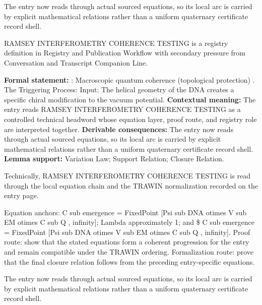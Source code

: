 The entry now reads through actual sourced equations, so its local arc is carried by explicit mathematical relations rather than a uniform quaternary certificate record shell.
\clearpage


\begingroup\small
{}
RAMSEY INTERFEROMETRY COHERENCE TESTING is a registry definition in Registry and Publication Workflow with secondary pressure from Conversation and Transcript Companion Line.

\begingroup\footnotesize\setlength{\emergencystretch}{3em}\sloppy
\textbf{Formal statement:} : Macroscopic quantum coherence (topological protection) . The Triggering Process: Input: The helical geometry of the DNA creates a specific chiral modification to the vacuum potential. \textbf{Contextual meaning:} The entry reads RAMSEY INTERFEROMETRY COHERENCE TESTING as a controlled technical headword whose equation layer, proof route, and registry role are interpreted together. \textbf{Derivable consequences:} The entry now reads through actual sourced equations, so its local arc is carried by explicit mathematical relations rather than a uniform quaternary certificate record shell. \textbf{Lemma support:} Variation Law; Support Relation; Closure Relation.\par
\endgroup

Technically, RAMSEY INTERFEROMETRY COHERENCE TESTING is read through the local equation chain and the TRAWIN normalization recorded on the entry page.

Equation anchors: C sub emergence = FixedPoint [Psi sub DNA otimes V sub EM otimes C sub Q , infinity]; Lambda approximately 1; and \$ C sub emergence = FixedPoint [Psi sub DNA otimes V sub EM otimes C sub Q , infinity]. Proof route: show that the stated equations form a coherent progression for the entry and remain compatible under the TRAWIN ordering. Formalization route: prove that the final closure relation follows from the preceding entry-specific equations.

The entry now reads through actual sourced equations, so its local arc is carried by explicit mathematical relations rather than a uniform quaternary certificate record shell.
\endgroup

